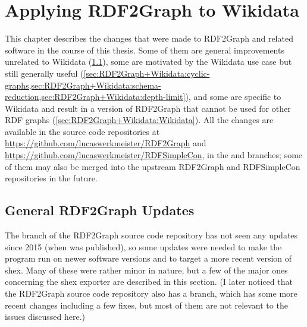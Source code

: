
\chapter{Applying \gls{RDF2Graph} to Wikidata}
\label{ch:RDF2Graph+Wikidata}

This chapter describes the changes that were made to \gls{RDF2Graph} and related software in the course of this thesis.
Some of them are general improvements unrelated to \gls{Wikidata} (\cref{sec:RDF2Graph+Wikidata:updates}),
some are motivated by the \gls{Wikidata} use case but still generally useful (\cref{sec:RDF2Graph+Wikidata:cyclic-graphs,sec:RDF2Graph+Wikidata:schema-reduction,sec:RDF2Graph+Wikidata:depth-limit}),
and some are specific to \gls{Wikidata} and result in a version of \gls{RDF2Graph}
that cannot be used for other RDF graphs (\cref{sec:RDF2Graph+Wikidata:Wikidata}).
All the changes are available in the source code repositories at
\url{https://github.com/lucaswerkmeister/RDF2Graph} and
\url{https://github.com/lucaswerkmeister/RDFSimpleCon},
in the  and  branches;
some of them may also be merged into the upstream \gls{RDF2Graph} and \gls{RDFSimpleCon} repositories in the future.

\section{General \gls{RDF2Graph} Updates}
\label{sec:RDF2Graph+Wikidata:updates}

The  branch of the \gls{RDF2Graph} source code repository
has not seen any updates since 2015 (when \cite{vanDam2015} was published),
so some updates were needed to make the program run on newer software versions
and to target a more recent version of \gls{shex}.
Many of these were rather minor in nature,
but a few of the major ones concerning the \gls{shex} exporter are described in this section.
(I later noticed that the \gls{RDF2Graph} source code repository
also has a  branch,
which has some more recent changes including a few fixes,
but most of them are not relevant to the issues discussed here.)

